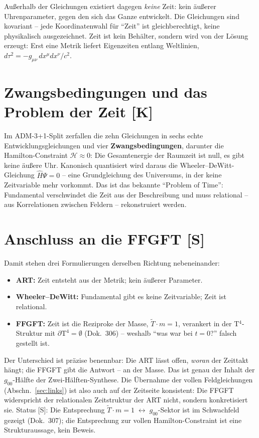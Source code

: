 Außerhalb der Gleichungen existiert dagegen \emph{keine} Zeit: kein
äußerer Uhrenparameter, gegen den sich das Ganze entwickelt. Die
Gleichungen sind kovariant -- jede Koordinatenwahl für
\enquote{Zeit} ist gleichberechtigt, keine physikalisch
ausgezeichnet. Zeit ist kein Behälter, sondern wird von der Lösung
erzeugt: Erst eine Metrik liefert Eigenzeiten entlang Weltlinien,
$d\tau^2 = -g_{\mu\nu}\,dx^\mu dx^\nu/c^2$.

\section{Zwangsbedingungen und das Problem der Zeit [K]}

Im ADM-3+1-Split zerfallen die zehn Gleichungen in sechs echte
Entwicklungsgleichungen und vier \textbf{Zwangsbedingungen},
darunter die Hamilton-Constraint $\mathcal{H} \approx 0$: Die
Gesamtenergie der Raumzeit ist null, es gibt keine äußere Uhr.
Kanonisch quantisiert wird daraus die Wheeler--DeWitt-Gleichung
$\hat{H}\Psi = 0$ -- eine Grundgleichung des Universums, in der
keine Zeitvariable mehr vorkommt. Das ist das bekannte
\enquote{Problem of Time}: Fundamental verschwindet die Zeit aus
der Beschreibung und muss relational -- aus Korrelationen zwischen
Feldern -- rekonstruiert werden.

\section{Anschluss an die FFGFT [S]}

Damit stehen drei Formulierungen derselben Richtung nebeneinander:

\begin{itemize}
  \item \textbf{ART:} Zeit entsteht aus der Metrik; kein äußerer
        Parameter.
  \item \textbf{Wheeler--DeWitt:} Fundamental gibt es keine
        Zeitvariable; Zeit ist relational.
  \item \textbf{FFGFT:} Zeit ist die Reziproke der Masse,
        $\tilde T \cdot m = 1$, verankert in der T$^4$-Struktur mit
        $\partial\text{T}^4 = \emptyset$ (Dok.~306) -- weshalb
        \enquote{was war bei $t=0$?} falsch gestellt ist.
\end{itemize}

Der Unterschied ist präzise benennbar: Die ART lässt offen,
\emph{woran} der Zeittakt hängt; die FFGFT gibt die Antwort -- an
der Masse. Das ist genau der Inhalt der $g_{00}$-Hälfte der
Zwei-Hälften-Synthese. Die Übernahme der vollen Feldgleichungen
(Abschn.~\ref{sec:links}) ist also auch auf der Zeitseite konsistent: Die FFGFT
widerspricht der relationalen Zeitstruktur der ART nicht, sondern
konkretisiert sie. Status [S]: Die Entsprechung
$\tilde T \cdot m = 1 \;\leftrightarrow\; g_{00}$-Sektor ist im
Schwachfeld gezeigt (Dok.~307); die Entsprechung zur vollen
Hamilton-Constraint ist eine Strukturaussage, kein Beweis.

